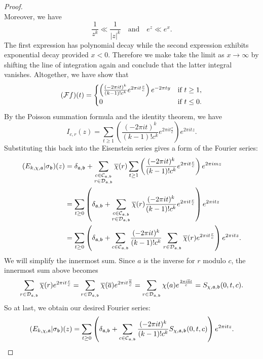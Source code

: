\begin{proof}
\[      \]
      Moreover, we have
      \[
        \frac{1}{z^{k}} \ll \frac{1}{|z|^{k}} \quad \text{and} \quad e^{z} \ll e^{x}.
      \]
      The first expression has polynomial decay while the second expression exhibits exponential decay provided $x < 0$. Therefore we make take the limit as $x \to \infty$ by shifting the line of integration again and conclude that the latter integral vanishes. Altogether, we have show that
      \[
        (\mathcal{F}f)(t) = \begin{cases} \left(\frac{(-2\pi it)^{k}}{(k-1)!c^{k}}e^{2\pi it\frac{r}{c}}\right)e^{-2\pi ty} & \text{if $t \ge 1$}, \\ 0 & \text{if $t \le 0$}. \end{cases}
      \]
      By the Poisson summation formula and the identity theorem, we have
      \[
        I_{c,r}(z) = \sum_{t \ge 1}\left(\frac{(-2\pi it)^{k}}{(k-1)!c^{k}}e^{2\pi it\frac{r}{c}}\right)e^{2\pi itz}.
      \]
      Substituting this back into the Eisenstein series gives a form of the Fourier series:
      \begin{align*}
        (E_{k,\chi,\mathfrak{a}}|\sigma_{\mathfrak{b}})(z) &= \delta_{\mathfrak{a},\mathfrak{b}}+\sum_{\substack{c \in \mathcal{C}_{\mathfrak{a},\mathfrak{b}} \\ r \in \mathcal{D}_{\mathfrak{a},\mathfrak{b}}}}\overline{\chi}(r)\sum_{t \ge 1}\left(\frac{(-2\pi it)^{k}}{(k-1)!c^{k}}e^{2\pi it\frac{r}{c}}\right)e^{2\pi imz} \\
        &= \sum_{t \ge 0}\left(\delta_{\mathfrak{a},\mathfrak{b}}+\sum_{\substack{c \in \mathcal{C}_{\mathfrak{a},\mathfrak{b}} \\ r \in \mathcal{D}_{\mathfrak{a},\mathfrak{b}}}}\overline{\chi}(r)\frac{(-2\pi it)^{k}}{(k-1)!c^{k}}e^{2\pi it\frac{r}{c}}\right)e^{2\pi itz} \\
        &= \sum_{t \ge 0}\left(\delta_{\mathfrak{a},\mathfrak{b}}+\sum_{\substack{c \in \mathcal{C}_{\mathfrak{a},\mathfrak{b}}}}\frac{(-2\pi it)^{k}}{(k-1)!c^{k}}\sum_{r \in \mathcal{D}_{\mathfrak{a},\mathfrak{b}}}\overline{\chi}(r)e^{2\pi it\frac{r}{c}}\right)e^{2\pi itz}.
      \end{align*}
      We will simplify the innermost sum. Since $a$ is the inverse for $r$ modulo $c$, the innermost sum above becomes
      \[
        \sum_{r \in \mathcal{D}_{\mathfrak{a},\mathfrak{b}}}\overline{\chi}(r)e^{2\pi it\frac{r}{c}} = \sum_{r \in \mathcal{D}_{\mathfrak{a},\mathfrak{b}}}\overline{\chi}(\overline{a})e^{2\pi it\frac{\overline{a}}{c}} = \sum_{r \in \mathcal{D}_{\mathfrak{a},\mathfrak{b}}}\chi(a)e^{\frac{2\pi i\overline{a}t}{c}} = S_{\chi,\mathfrak{a},\mathfrak{b}}(0,t,c).
      \]
      So at last, we obtain our desired Fourier series:
      \[
        (E_{k,\chi,\mathfrak{a}}|\sigma_{\mathfrak{b}})(z) = \sum_{t \ge 0}\left(\delta_{\mathfrak{a},\mathfrak{b}}+\sum_{\substack{c \in \mathcal{C}_{\mathfrak{a},\mathfrak{b}}}}\frac{(-2\pi it)^{k}}{(k-1)!c^{k}}S_{\chi,\mathfrak{a},\mathfrak{b}}(0,t,c)\right)e^{2\pi itz}.
      \]
    \end{proof}

